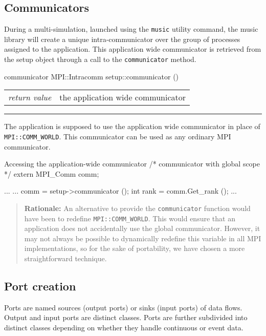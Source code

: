 \documentclass[a4paper]{report}
\makeatletter
\newenvironment{rationale}%
{\par\begin{quote}\textbf{Rationale:}}%
{\par\end{quote}}
\newenvironment{parameters}%
{\begin{tabular}{@{\hspace{2em}}lp{0.6\textwidth}}}%
{\end{tabular}\par\vspace{1mm}\par\hrule\par\vspace{5mm}}
\makeatother
\begin{document}
\subsection{Communicators}

During a multi-simulation, launched using the \lstinline|music|
utility command, the music library will create a unique
intra-communicator over the group of processes assigned to the
application.  This application wide communicator is retrieved from the
setup object through a call to the
\lstinline|communicator| method.

\begin{head}{communicator}
  MPI::Intracomm setup::communicator ()
\end{head}
\begin{parameters}
  \emph{return value} & the application wide communicator \\
\end{parameters}

The application is supposed to use the application wide communicator
in place of
\lstinline|MPI::COMM_WORLD|.
This communicator can be used as any ordinary MPI communicator.

\begin{code}{Accessing the application-wide communicator}
/* communicator with global scope */
extern MPI_Comm comm;

...
{
  ...
  comm = setup->communicator ();
  int rank = comm.Get_rank ();
  ...
}
\end{code}

\begin{rationale}
  An alternative to provide the \lstinline|communicator| function
  would have been to redefine \lstinline|MPI::COMM_WORLD|.  This would
  ensure that an application does not accidentally use the global
  communicator.  However, it may not always be possible to dynamically
  redefine this variable in all MPI implementations, so for the sake
  of portability, we have chosen a more straightforward technique.
\end{rationale}


\subsection{Port creation}

Ports are named sources (output ports) or sinks (input
ports) of data flows.  Output and input ports are distinct classes.
Ports are further subdivided into distinct classes depending on
whether they handle continuous or event data.
\end{document}
